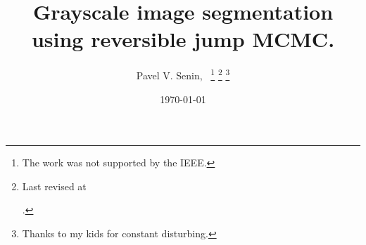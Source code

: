 \documentclass[journal]{IEEEtran}
\begin{document}
%
\title{Grayscale image segmentation using reversible jump MCMC.}
%
%
\author{Pavel V. Senin,~%
\thanks{The work was not supported by the IEEE.}%
\thanks{Last revised at \date{\today}.}%
\thanks{Thanks to my kids for constant disturbing.}}
% 
%
%
% 


\end{document}

